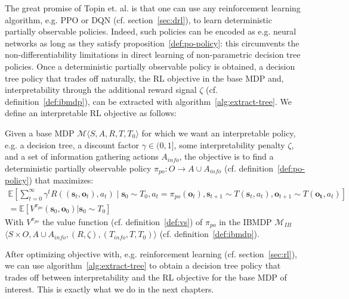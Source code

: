 The great promise of Topin et. al. is that one can use any reinforcement learning algorithm, e.g. PPO or DQN (cf. section~\ref{sec:drl}), to learn deterministic partially observable policies. Indeed, such policies can be encoded as e.g. neural networks as long as they satisfy proposition~\ref{def:po-policy}: this circumvents the non-differentiability limitations in direct learning of non-parametric decision tree policies.
Once a deterministic partially observable policy is obtained, a decision tree policy that trades off naturally, the RL objective in the base MDP and, interpretability through the additional reward signal $\zeta$ (cf. definition~\ref{def:ibmdp}), can be extracted with algorithm~\ref{alg:extract-tree}.
We define an interpretable RL objective as follows:
\begin{definition}\label{def:irl}
    Given a base MDP $\mathcal{M} \langle S, A, R, T, T_0 \rangle$ for which we want an interpretable policy, e.g. a decision tree, a discount factor $\gamma \in (0,1]$, some interpretability penalty $\zeta$, and a set of information gathering actions $A_{info}$, the objective is to find a deterministic partially observable policy $\pi_{po}: O \rightarrow A\cup A_{info}$ (cf. definition~\ref{def:po-policy}) that maximizes:
\begin{align*}
    \mathbb{E}\left[\sum_{t=0}^{\infty} \gamma^t R((\boldsymbol{s}_t, \boldsymbol{o}_t), a_t) \mid \boldsymbol{s}_0 \sim T_0, a_t = \pi_{po}(\boldsymbol{o}_t), \boldsymbol{s}_{t+1} \sim T(\boldsymbol{s}_t, a_t), \boldsymbol{o}_{t+1}\sim T(\boldsymbol{o_t}, a_t)\right]\\
    = \mathbb{E}[V^{\pi_{po}}(\boldsymbol{s}_0, \boldsymbol{o}_0)| \boldsymbol{s}_0\sim T_0]
\end{align*}
With $V^{\pi_{po}}$ the value function (cf. definition~\ref{def:vs}) of $\pi_{po}$ in the IBMDP $\mathcal{M}_{IB}$ $\langle S \times O,A \cup A_{info}, (R, \zeta), (T_{info}, T, T_0)\rangle$ (cf. definition~\ref{def:ibmdp}).
\end{definition}

After optimizing objective with, e.g. reinforcement learning (cf. section~\ref{sec:rl}), we can use algorithm~\ref{alg:extract-tree} to obtain a decision tree policy that trades off between interpretability and the RL objective for the base MDP of interest.
This is exactly what we do in the next chapters.
        
